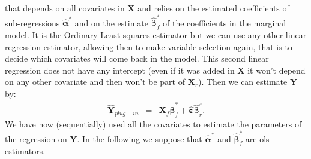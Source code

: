 \documentclass[12pt,a4paper]{report}
\begin{document}
that depends on all covariates in $\boldsymbol{X}$ and relies on the estimated coefficients of sub-regressions $\hat{\boldsymbol{\alpha}}^*$ and on the estimate $\hat{\boldsymbol{\beta}}_f^*$ of the coefficients in the marginal model. It is the Ordinary Least squares estimator but we can use any other linear regression estimator, allowing then to make variable selection again, that is to decide which covariates will come back in the model. This second linear regression does not have any intercept (even if it was added in $\boldsymbol{X}$ it won't depend on any other covariate and then won't be part of $\boldsymbol{X}_r$).
Then we can estimate $\boldsymbol{Y}$ by:
\begin{eqnarray}
	\hat{\boldsymbol{Y}}_{plug-in}&=&\boldsymbol{X}_f\hat{\boldsymbol{\beta}}^*_f + \hat{\boldsymbol{\varepsilon}}\hat{\boldsymbol{\beta}}_{r}^{\varepsilon}. \label{hatYplugin} 
\end{eqnarray}
 We have now (sequentially) used all the covariates to estimate the parameters of the regression on $\boldsymbol{Y}$. 	In the following we suppose that $\hat{\boldsymbol{\alpha}}^*$ and $\hat{\boldsymbol{\beta}}_f^*$ are {\sc ols} estimators. 
\\
\end{document}
